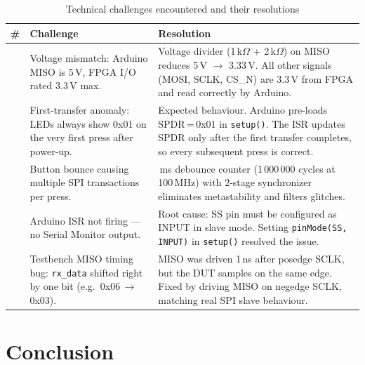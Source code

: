\documentclass[12pt,a4paper]{report}
\begin{document}
\begin{table}[H]
  \centering
  \caption{Technical challenges encountered and their resolutions}
  \label{tab:challenges}
  \renewcommand{\arraystretch}{1.4}
  \begin{tabularx}{\linewidth}{>{\centering\arraybackslash}p{0.4cm}
                               >{\raggedright\arraybackslash}p{5.8cm}
                               >{\raggedright\arraybackslash}X}
    \toprule
    \textbf{\#} & \textbf{Challenge} & \textbf{Resolution} \\
    \midrule
    1 & Voltage mismatch: Arduino MISO is 5\,V, FPGA I/O rated 3.3\,V max.
      & Voltage divider (1\,k$\Omega$ + 2\,k$\Omega$) on MISO reduces 5\,V $\to$ 3.33\,V.
        All other signals (MOSI, SCLK, CS\_N) are 3.3\,V from FPGA and read correctly by Arduino. \\
    2 & First-transfer anomaly: LEDs always show 0x01 on the very first press after power-up.
      & Expected behaviour. Arduino pre-loads SPDR\,=\,0x01 in \texttt{setup()}.
        The ISR updates SPDR only after the first transfer completes, so every subsequent press is correct. \\
    3 & Button bounce causing multiple SPI transactions per press.
      & 10\,ms debounce counter (1\,000\,000 cycles at 100\,MHz) with 2-stage synchronizer
        eliminates metastability and filters glitches. \\
    4 & Arduino ISR not firing --- no Serial Monitor output.
      & Root cause: SS pin must be configured as INPUT in slave mode.
        Setting \texttt{pinMode(SS,\,INPUT)} in \texttt{setup()} resolved the issue. \\
    5 & Testbench MISO timing bug: \texttt{rx\_data} shifted right by one bit
        (e.g.\ 0x06\,$\to$\,0x03).
      & MISO was driven 1\,ns after posedge SCLK, but the DUT samples on the same edge.
        Fixed by driving MISO on negedge SCLK, matching real SPI slave behaviour. \\
    \bottomrule
  \end{tabularx}
  \renewcommand{\arraystretch}{1}
\end{table}

\chapter{Conclusion}
\end{document}
